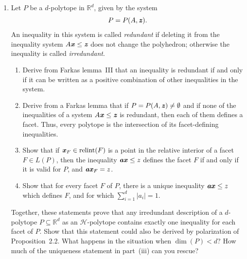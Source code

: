 \documentclass{article}
\begin{document}
\begin{enumerate}
\begin{solution}
\begin{proof}
    Now, (v) follows from the earlier line of reasoning that $\bi{cx} \leq 0$ implies $\bi{x}^\trans\bi{c}^\trans = (\bi{cx})^\trans \leq 0$, which becomes a bi-conditional. For (vi) we show that 
    \[\{\bi{c}: \bi{cx} \leq 0 \textup{ for all }\bi{x}\in C\} = \{\bi{c}: \bi{cv} \leq 0 \textup{ for all }\bi{v}\in V(C)\}\]
    Which is immediate because on one hand $V(C) \subseteq C$ and on the other hand $\bi{cv} \leq 0$ for all $\bi{v}\in V$ means $\bi{cx} = \bi{c}\left(\sum\lambda_i\bi{v}_i\right)= \sum\lambda_i\bi{cv}_i \leq 0$.

    For (vii)
\end{proof}
\end{solution}

\item Let $P$ be a $d$-polytope in $\mathbb{R}^d$, given by the system \[
P = P(A,\textbf{\textit{z}}).
\] An inequality in this system is called \emph{redundant} if deleting it from the inequality system $A \textbf{\textit{x}} \le \textbf{\textit{z}}$ does not change the polyhedron; otherwise the inequality is called \emph{irredundant}.
\begin{enumerate}[label=(\roman*)] 

\item Derive from Farkas lemma~III that an inequality is redundant if and only if it can be written as a positive combination of other inequalities in the system.

\item Derive from a Farkas lemma that if $P = P(A,\textbf{\textit{z}}) \ne \emptyset$ and if none of the inequalities of a system $A \textbf{\textit{x}} \le \textbf{\textit{z}}$ is redundant, then each of them defines a facet. Thus, every polytope is the intersection of its facet-defining inequalities.

\item Show that if $\textbf{\textit{x}}_F \in \operatorname{relint}(F)$ is a point in the relative interior of a facet $F \in L(P)$, then the inequality $\textbf{\textit{ax}} \le z$ defines the facet $F$ if and only if it is valid for $P$, and $\textbf{\textit{ax}}_F = z$.

\item Show that for every facet $F$ of $P$, there is a unique inequality $\textbf{\textit{ax}} \le z$ which defines $F$, and for which $\sum_{i=1}^d |a_i| = 1$.
\end{enumerate}

Together, these statements prove that any irredundant description of a $d$-polytope $P \subseteq \mathbb{R}^d$ as an $\mathcal{H}$-polytope contains exactly one inequality for each facet of $P$. Show that this statement could also be derived by polarization of Proposition~2.2. What happens in the situation when $\dim(P) < d$? How much of the uniqueness statement in part~(iii) can you rescue?


\end{enumerate}
\end{document}
